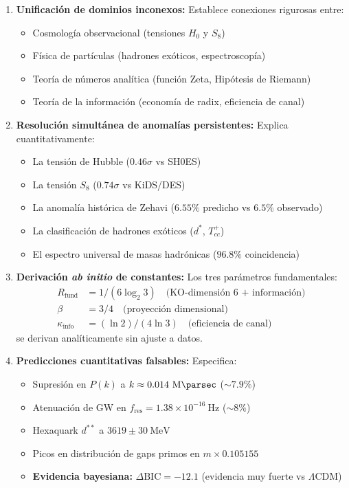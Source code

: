 \documentclass[11pt, a4paper]{article}
\theoremstyle{plain}
\theoremstyle{definition}
\newcommand{\Rfactor}{R_{\text{fund}}}
\newcommand{\Kinfo}{\kappa_{\text{info}}}
\begin{document}
\begin{enumerate}
    \item \textbf{Unificación de dominios inconexos:} Establece conexiones rigurosas entre:
    \begin{itemize}
        \item Cosmología observacional (tensiones $H_0$ y $S_8$)
        \item Física de partículas (hadrones exóticos, espectroscopía)
        \item Teoría de números analítica (función Zeta, Hipótesis de Riemann)
        \item Teoría de la información (economía de radix, eficiencia de canal)
    \end{itemize}
    
    \item \textbf{Resolución simultánea de anomalías persistentes:} Explica cuantitativamente:
    \begin{itemize}
        \item La tensión de Hubble ($0.46\sigma$ vs SH0ES)
        \item La tensión $S_8$ ($0.74\sigma$ vs KiDS/DES)
        \item La anomalía histórica de Zehavi ($6.55\%$ predicho vs $6.5\%$ observado)
        \item La clasificación de hadrones exóticos ($d^*$, $T_{cc}^+$)
        \item El espectro universal de masas hadrónicas ($96.8\%$ coincidencia)
    \end{itemize}
    
    \item \textbf{Derivación \textit{ab initio} de constantes:} Los tres parámetros fundamentales:
    \begin{align*}
        \Rfactor &= 1/(6\log_2 3) \quad \text{(KO-dimensión 6 + información)} \\
        \beta &= 3/4 \quad \text{(proyección dimensional)} \\
        \Kinfo &= (\ln 2)/(4\ln 3) \quad \text{(eficiencia de canal)}
    \end{align*}
    se derivan analíticamente sin ajuste a datos.
    
    \item \textbf{Predicciones cuantitativas falsables:} Especifica:
    \begin{itemize}
        \item Supresión en $P(k)$ a $k \approx 0.014\ \si{\per\mega\parsec}$ ($\sim 7.9\%$)
        \item Atenuación de GW en $f_{\text{res}} = 1.38 \times 10^{-16}\ \si{\hertz}$ ($\sim 8\%$)
        \item Hexaquark $d^{**}$ a $3619 \pm 30\ \si{\mega\electronvolt}$
        \item Picos en distribución de gaps primos en $m \times 0.105155$
        \item \textbf{Evidencia bayesiana:} $\Delta\text{BIC} = -12.1$ (evidencia muy fuerte vs $\Lambda$CDM)
    \end{itemize}


\end{enumerate}
\end{document}
